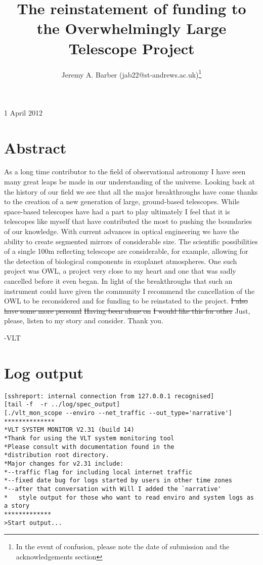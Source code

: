 \documentclass[12pt]{iopart}
\begin{document}

\graphicspath{{figures/}}

\title{The reinstatement of funding to the Overwhelmingly Large Telescope Project}
\author{Jeremy A. Barber (jab22@st-andrews.ac.uk)\footnote{In the event of confusion, please note the date of submission and the acknowledgements section}}
\begin{center}
\large{1 April 2012}
\end{center}

\section{Abstract}
As a long time contributor to the field of observational astronomy I have seen many great leaps be made in our understanding of the universe. Looking back at the history of our field we see that all the major breakthroughs have come thanks to the creation of a new generation of large, ground-based telescopes. While space-based telescopes have had a part to play ultimately I feel that it is telescopes like myself that have contributed the most to pushing the boundaries of our knowledge. With current advances in optical engineering we have the ability to create segmented mirrors of considerable size. The scientific possibilities of a single 100m reflecting telescope are considerable, for example, allowing for the detection of biological components in exoplanet atmospheres. One such project was OWL, a project very close to my heart and one that was sadly cancelled before it even began. In light of the breakthroughs that such an instrument could have given the community I recommend the cancellation of the OWL to be reconsidered and for funding to be reinstated to the project. \sout{I also have some more personal} \sout{Having been alone on} \sout{I would like this for other} Just, please, listen to my story and consider. Thank you.

-VLT
\newpage

\section{Log output}
\begin{verbatim}
[sshreport: internal connection from 127.0.0.1 recognised]
[tail -f  -r ../log/spec_output]
[./vlt_mon_scope --enviro --net_traffic --out_type='narrative']
**************
*VLT SYSTEM MONITOR V2.31 (build 14)
*Thank for using the VLT system monitoring tool
*Please consult with documentation found in the
*distribution root directory.
*Major changes for v2.31 include:
*--traffic flag for including local internet traffic
*--fixed date bug for logs started by users in other time zones
*--after that conversation with Will I added the `narrative'
*   style output for those who want to read enviro and system logs as a story
*************
>Start output...
\end{verbatim}
\end{document}
